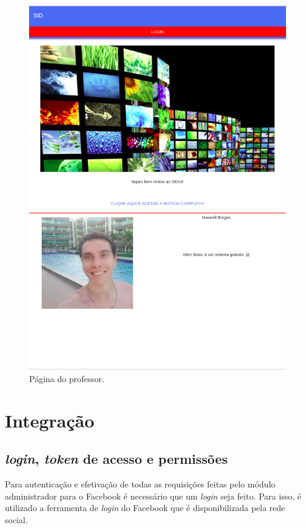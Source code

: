 \begin{figure}[H]
\centering
\includegraphics[scale=0.5]{figuras/mobile1}
\caption{Página do professor.}
\label{fig:mobile3}
\end{figure}

\section{Integração}
\subsection{\textit{login}, \textit{token} de acesso e permissões}
Para autenticação e efetivação de todas as requisições feitas pelo módulo administrador para o Facebook é necessário que um \textit{login} seja feito. Para isso, é utilizado a ferramenta de \textit{login} do Facebook que é disponibilizada pela rede social.

